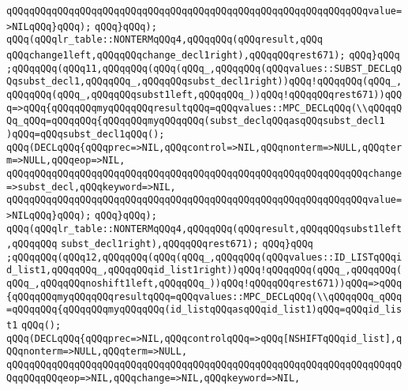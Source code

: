 \verb|qQQqqQQqqQQqqQQqqQQqqQQqqQQqqQQqqQQqqQQqqQQqqQQqqQQqqQQqqQQqqQQqvalue=>NILqQQq}qQQq);|\newline
\verb|qQQq}qQQq);|\newline
\verb|qQQq(qQQqlr_table::NONTERMqQQq4,qQQqqQQq(qQQqresult,qQQq|\newline
\verb|qQQqchange1left,qQQqqQQqchange_decl1right),qQQqqQQqrest671);|\newline
\verb|qQQq}qQQq|\newline
\verb|;qQQqqQQq(qQQq11,qQQqqQQq(qQQq(qQQq_,qQQqqQQq(qQQqvalues::SUBST_DECLqQQqsubst_decl1,qQQqqQQq_,qQQqqQQqsubst_decl1right))qQQq!qQQqqQQq(qQQq_,qQQqqQQq(qQQq_,qQQqqQQqsubst1left,qQQqqQQq_))qQQq!qQQqqQQqrest671))qQQq=>qQQq{qQQqqQQqmyqQQqqQQqresultqQQq=qQQqvalues::MPC_DECLqQQq(\\qQQqqQQq_qQQq=qQQqqQQq{qQQqqQQqmyqQQqqQQq(subst_declqQQqasqQQqsubst_decl1|\newline
\verb|)qQQq=qQQqsubst_decl1qQQq();|\newline
\verb|qQQq(DECLqQQq{qQQqprec=>NIL,qQQqcontrol=>NIL,qQQqnonterm=>NULL,qQQqterm=>NULL,qQQqeop=>NIL,|\newline
\verb|qQQqqQQqqQQqqQQqqQQqqQQqqQQqqQQqqQQqqQQqqQQqqQQqqQQqqQQqqQQqqQQqchange=>subst_decl,qQQqkeyword=>NIL,|\newline
\verb|qQQqqQQqqQQqqQQqqQQqqQQqqQQqqQQqqQQqqQQqqQQqqQQqqQQqqQQqqQQqqQQqvalue=>NILqQQq}qQQq);|\newline
\verb|qQQq}qQQq);|\newline
\verb|qQQq(qQQqlr_table::NONTERMqQQq4,qQQqqQQq(qQQqresult,qQQqqQQqsubst1left,qQQqqQQq|\newline
\verb|subst_decl1right),qQQqqQQqrest671);|\newline
\verb|qQQq}qQQq|\newline
\verb|;qQQqqQQq(qQQq12,qQQqqQQq(qQQq(qQQq_,qQQqqQQq(qQQqvalues::ID_LISTqQQqid_list1,qQQqqQQq_,qQQqqQQqid_list1right))qQQq!qQQqqQQq(qQQq_,qQQqqQQq(qQQq_,qQQqqQQqnoshift1left,qQQqqQQq_))qQQq!qQQqqQQqrest671))qQQq=>qQQq{qQQqqQQqmyqQQqqQQqresultqQQq=qQQqvalues::MPC_DECLqQQq(\\qQQqqQQq_qQQq=qQQqqQQq{qQQqqQQqmyqQQqqQQq(id_listqQQqasqQQqid_list1)qQQq=qQQqid_list1|\newline
\verb|qQQq();|\newline
\verb|qQQq(DECLqQQq{qQQqprec=>NIL,qQQqcontrolqQQq=>qQQq[NSHIFTqQQqid_list],qQQqnonterm=>NULL,qQQqterm=>NULL,|\newline
\verb|qQQqqQQqqQQqqQQqqQQqqQQqqQQqqQQqqQQqqQQqqQQqqQQqqQQqqQQqqQQqqQQqqQQqqQQqqQQqqQQqeop=>NIL,qQQqchange=>NIL,qQQqkeyword=>NIL,|\newline
